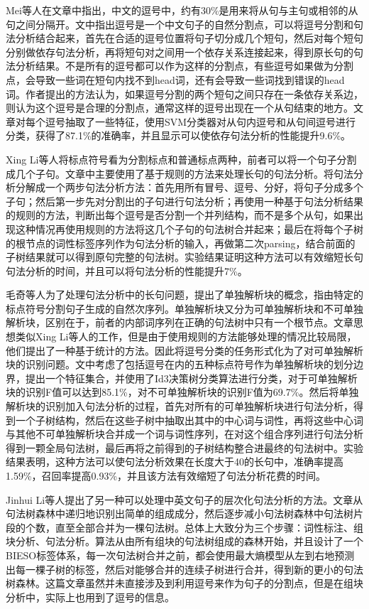 \documentclass[master, winfont]{njuthesis}
\begin{document}
Mei等人\cite{Jin2004}在文章中指出，中文的逗号中，约有30\%是用来将从句与主句或相邻的从句之间分隔开。文中指出逗号是一个中文句子的自然分割点，可以将逗号分割和句法分析结合起来，首先在合适的逗号位置将句子切分成几个短句，然后对每个短句分别做依存句法分析，再将短句对之间用一个依存关系连接起来，得到原长句的句法分析结果。不是所有的逗号都可以作为这样的分割点，有些逗号如果做为分割点，会导致一些词在短句内找不到head词，还有会导致一些词找到错误的head词。作者提出的方法认为，如果逗号分割的两个短句之间只存在一条依存关系边，则认为这个逗号是合理的分割点，通常这样的逗号出现在一个从句结束的地方。文章对每个逗号抽取了一些特征，使用SVM分类器对从句内逗号和从句间逗号进行分类，获得了87.1\%的准确率，并且显示可以使依存句法分析的性能提升9.6\%。

Xing Li等人\cite{Li2004}将标点符号看为分割标点和普通标点两种，前者可以将一个句子分割成几个子句。文章中主要使用了基于规则的方法来处理长句的句法分析。将句法分析分解成一个两步句法分析方法：首先用所有冒号、逗号、分好，将句子分成多个子句；然后第一步先对分割出的子句进行句法分析；再使用一种基于句法分析结果的规则的方法，判断出每个逗号是否分割一个并列结构，而不是多个从句，如果出现这种情况再使用规则的方法将这几个子句的句法树合并起来；最后在将每个子树的根节点的词性标签序列作为句法分析的输入，再做第二次parsing，结合前面的子树结果就可以得到原句完整的句法树。实验结果证明这种方法可以有效缩短长句句法分析的时间，并且可以将句法分析的性能提升7\%。

毛奇等人\cite{2007}为了处理句法分析中的长句问题，提出了单独解析块的概念，指由特定的标点符号分割句子生成的自然次序列。单独解析块又分为可单独解析块和不可单独解析块，区别在于，前者的内部词序列在正确的句法树中只有一个根节点。文章思想类似Xing Li等人\cite{Li2004}的工作，但是由于使用规则的方法能够处理的情况比较局限，他们提出了一种基于统计的方法。因此将逗号分类的任务形式化为了对可单独解析块的识别问题。文中考虑了包括逗号在内的五种标点符号作为单独解析块的划分边界，提出一个特征集合，并使用了Id3决策树分类算法进行分类，对于可单独解析块的识别F值可以达到85.1\%，对不可单独解析块的识别F值为69.7\%。然后将单独解析块的识别加入句法分析的过程，首先对所有的可单独解析块进行句法分析，得到一个子树结构，然后在这些子树中抽取出其中的中心词与词性，再将这些中心词与其他不可单独解析块合并成一个词与词性序列，在对这个组合序列进行句法分析得到一颗全局句法树，最后再将之前得到的子树结构整合进最终的句法树中。实验结果表明，这种方法可以使句法分析效果在长度大于40的长句中，准确率提高1.59\%，召回率提高0.93\%，并且该方法有效缩短了句法分析花费的时间。

Jinhui Li等人\cite{Li2008}提出了另一种可以处理中英文句子的层次化句法分析的方法。文章从句法树森林中递归地识别出简单的组成成分，然后逐步减小句法树森林中句法树片段的个数，直至全部合并为一棵句法树。总体上大致分为三个步骤：词性标注、组块分析、句法分析。算法从由所有组块的句法树组成的森林开始，并且设计了一个BIESO标签体系，每一次句法树合并之前，都会使用最大熵模型从左到右地预测出每一棵子树的标签，然后对能够合并的连续子树进行合并，得到新的更小的句法树森林。这篇文章虽然并未直接涉及到利用逗号来作为句子的分割点，但是在组块分析中，实际上也用到了逗号的信息。
\end{document}
